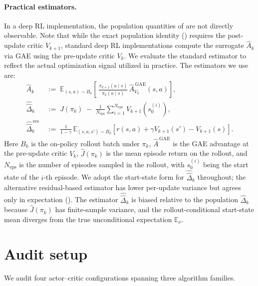 \documentclass{article}
\begin{document}
\paragraph{Practical estimators.}
In a deep RL implementation, the population quantities of  are not directly observable. Note that while the exact population identity () requires the post-update critic $V_{k+1}$, standard deep RL implementations compute the surrogate $\widehat{A}_k$ via GAE using the pre-update critic $V_k$. We evaluate the standard estimator to reflect the actual optimization signal utilized in practice. The estimators we use are:
\begin{align}
\label{eq:Ak-est}
\widehat{A}_k
  &\;:=\; \mathbb{E}_{(s,a) \sim B_k}\!\left[\,
      \tfrac{\pi_{k+1}(a \mid s)}{\pi_k(a \mid s)}\,\hat A^{\,\mathrm{GAE}}_{V_k}(s, a)
    \right],\\[0.2em]
\label{eq:dhat-est}
\widehat{\hat\Delta}_k
  &\;:=\; \widehat{J}(\pi_k) \;-\; \tfrac{1}{N_{\text{eps}}}\sum_{i=1}^{N_{\text{eps}}} V_{k+1}(s_0^{(i)}), \\[0.2em]
\label{eq:delta-hat-res}
\widehat{\hat\Delta}^{\,\mathrm{res}}_k
  &\;:=\; \frac{1}{1-\gamma}\,\mathbb{E}_{(s,a,s') \sim B_k}\!\left[r(s,a) + \gamma V_{k+1}(s') - V_{k+1}(s)\right].
\end{align}
Here $B_k$ is the on-policy rollout batch under $\pi_k$, $\hat A^{\,\mathrm{GAE}}$ is the GAE \citep{schulman2015high} advantage at the pre-update critic $V_k$, $\widehat{J}(\pi_k)$ is the mean episode return on the rollout, and $N_{\text{eps}}$ is the number of episodes sampled in the rollout, with $s_0^{(i)}$ being the start state of the $i$-th episode. We adopt the start-state form  for $\widehat{\hat\Delta}_k$ throughout; the alternative residual-based estimator  has lower per-update variance but agrees only in expectation (). The estimator $\widehat{\hat\Delta}_k$ is biased relative to the population $\hat\Delta_k$ because $\widehat{J}(\pi_k)$ has finite-sample variance, and the rollout-conditional start-state mean diverges from the true unconditional expectation $\mathbb{E}_\nu$.


\section{Audit setup}
\label{sec:audit}

We audit four actor--critic configurations spanning three algorithm families.
\end{document}
